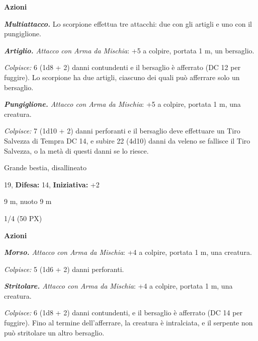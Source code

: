 \begin{multicols}{2}
{\textbf{Azioni}

\emph{\textbf{Multiattacco.}} Lo scorpione effettua tre attacchi: due con gli artigli e uno con il pungiglione.

\emph{\textbf{Artiglio.} Attacco con Arma da Mischia}: +5 a colpire, portata 1 m, un bersaglio.

\emph{Colpisce:} 6 (1d8 + 2) danni contundenti e il bersaglio è afferrato (DC 12 per fuggire). Lo scorpione ha due artigli, ciascuno dei quali può afferrare solo un bersaglio.

\emph{\textbf{Pungiglione.} Attacco con Arma da Mischia}: +5 a colpire, portata 1 m, una creatura.

\emph{Colpisce:} 7 (1d10 + 2) danni perforanti e il bersaglio deve effettuare un Tiro Salvezza di Tempra DC 14, e subire 22 (4d10) danni da veleno se fallisce il Tiro Salvezza, o la metà di questi danni se lo riesce.

\begin{description}[noitemsep, topsep=0pt, parsep=0pt, partopsep=0pt, leftmargin=0cm, labelwidth=2.2cm]
    \item[\textbf{Taglia/Tipo:}] Grande bestia, disallineato
    \item[\textbf{Caratt.:}] 
    \item[\textbf{Punti Ferita:}] 19,  \textbf{Difesa:} 14,  \textbf{Iniziativa:} +2
    \item[\textbf{Tiri Salvez.:}] 
    \item[\textbf{Movimento:}] 9 m, nuoto 9 m
    \item[\textbf{Sfida:}] 1/4 (50 PX)\smallskip
\end{description}

\textbf{Azioni}

\emph{\textbf{Morso.} Attacco con Arma da Mischia}: +4 a colpire, portata 1 m, una creatura.

\emph{Colpisce:} 5 (1d6 + 2) danni perforanti.

\emph{\textbf{Stritolare.} Attacco con Arma da Mischia}: +4 a colpire, portata 1 m, una creatura.

\emph{Colpisce:} 6 (1d8 + 2) danni contundenti, e il bersaglio è afferrato (DC 14 per fuggire). Fino al termine dell'afferrare, la creatura è intralciata, e il serpente non può stritolare un altro bersaglio.

}
\end{multicols}
